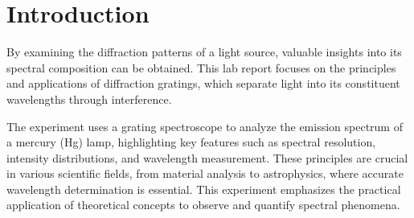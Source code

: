 \section{Introduction}
By examining the diffraction patterns of a light source, valuable insights into its spectral composition can be obtained. This lab report focuses on the principles and applications of diffraction gratings, which separate light into its constituent wavelengths through interference.

The experiment uses a grating spectroscope to analyze the emission spectrum of a mercury (Hg) lamp, highlighting key features such as spectral resolution, intensity distributions, and wavelength measurement. These principles are crucial in various scientific fields, from material analysis to astrophysics, where accurate wavelength determination is essential. This experiment emphasizes the practical application of theoretical concepts to observe and quantify spectral phenomena.
